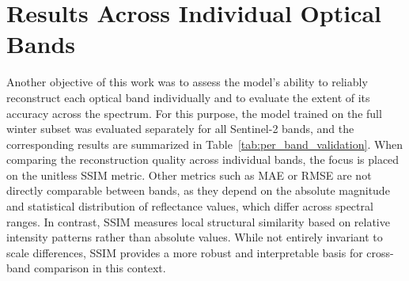 \section{Results Across Individual Optical Bands}
Another objective of this work was to assess the model’s ability to reliably reconstruct each optical band individually and to evaluate the extent of its accuracy across the spectrum. 
For this purpose, the model trained on the full winter subset was evaluated separately for all Sentinel-2 bands, and the corresponding results are summarized in Table~\ref{tab:per_band_validation}.
When comparing the reconstruction quality across individual bands, the focus is placed on the unitless SSIM metric. Other metrics such as MAE or RMSE are not directly comparable between bands, as they depend on the absolute magnitude and statistical distribution of reflectance values, which differ across spectral ranges. In contrast, SSIM measures local structural similarity based on relative intensity patterns rather than absolute values. While not entirely invariant to scale differences, SSIM provides a more robust and interpretable basis for cross-band comparison in this context.
